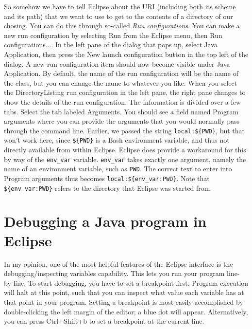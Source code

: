 \documentclass[12pt, a4paper, twoside, openany, titlepage]{book}
\begin{document}
So somehow we have to tell Eclipse about the URI (including both its scheme and its path) that we want to use to get to the contents of a directory of our chosing. You can do this through so-called \textit{Run configurations}. You can make a new run configuration by selecting \textsf{Run} from the Eclipse menu, then \textsf{Run configurations...}. In the left pane of the dialog that pops up, select \textsf{Java Application}, then press the \textsf{New launch configuration} button in the top left of the dialog. A new run configuration item should now become visible under \textsf{Java Application}. By default, the name of the run configuration will be the name of the class, but you can change the name to whatever you like. When you select the \textsf{DirectoryListing} run configuration in the left pane, the right pane changes to show the details of the run configuration. The information is divided over a few tabs. Select the tab labeled \textsf{Arguments}. You should see a field named \textsf{Program arguments} where you can provide the arguments that you would normally pass through the command line. Earlier, we passed the string \texttt{local:\$\{PWD\}}, but that won't work here, since \texttt{\$\{PWD\}} is a Bash environment variable, and thus not directly available from within Eclipse. Eclipse does provide a workaround for this by way of the \texttt{env\_var} variable. \texttt{env\_var} takes exactly one argument, namely the name of an environment variable, such as \texttt{PWD}. The correct text to enter into \textsf{Program arguments} thus becomes \texttt{local:\$\{env\_var:PWD\}}. Note that \texttt{\$\{env\_var:PWD\}} refers to the directory that Eclipse was started from.





\section{Debugging a Java program in Eclipse}




In my opinion, one of the most helpful features of the Eclipse interface is the debugging/inspecting variables capability. This lets you run your program line-by-line. To start debugging, you have to set a breakpoint first. Program execution will halt at this point, such that you can inspect what value each variable has at that point in your program. Setting a breakpoint is most easily accomplished by double-clicking the left margin of the editor; a blue dot will appear. Alternatively, you can press \textsf{Ctrl+Shift+b} to set a breakpoint at the current line.
\end{document}

